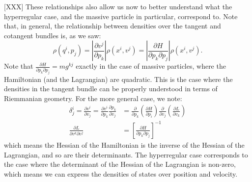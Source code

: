 \documentclass[letterpaper]{article}
\begin{document}
[XXX] These relationships also allow us now to better understand what the hyperregular case, and the massive particle in particular, correspond to. Note that, in general, the relationship between densities over the tangent and cotangent bundles is, as we saw:
\begin{equation}
\rho(q^i, p_j) = \left|\frac{\partial v^j}{\partial p_k}\right| \rho(x^i, v^j)  = \left|\frac{\partial H}{\partial p_k \partial p_j}\right| \rho(x^i, v^j).
\end{equation}
Note that $\frac{\partial H}{\partial p_k \partial p_j} = m g^{kj}$ exactly in the case of massive particles, where the Hamiltonian (and the Lagrangian) are quadratic. This is the case where the densities in the tangent bundle can be properly understood in terms of Riemmanian geometry. For the more general case, we note:
\begin{equation}
\begin{aligned}
\delta^i_j = \frac{\partial v^i}{\partial v_j} = \frac{\partial v^i}{\partial p_k}\frac{\partial p_k}{\partial v_j} &= \frac{\partial}{\partial p_k}\left(\frac{\partial H}{\partial p_i}\right) \frac{\partial }{\partial v_j} \left( \frac{\partial L}{\partial v_k} \right) \\
\frac{\partial L}{\partial v^k \partial v^j} &= \left[ \frac{\partial H}{\partial p_k \partial p_j} \right]^{-1}
\end{aligned}
\end{equation}
which means the Hessian of the Hamiltonian is the inverse of the Hessian of the Lagrangian, and so are their determinants. The hyperregular case corresponds to the case where the determinant of the Hessian of the Lagrangian is non-zero, which means we can express the densities of states over position and velocity.


\end{document}

